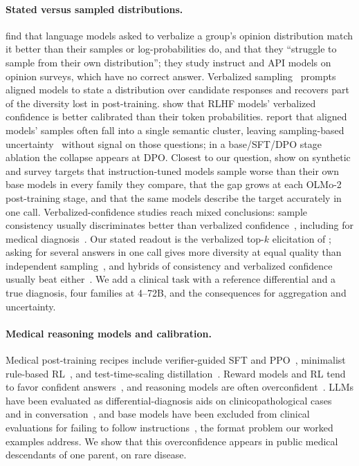 \documentclass[11pt]{article}
\begin{document}
\paragraph{Stated versus sampled distributions.}
\citet{meister2025distributional} find that language models asked to verbalize a group's opinion distribution match it better than their samples or log-probabilities do, and that they ``struggle to sample from their own distribution''; they study instruct and API models on opinion surveys, which have no correct answer.
Verbalized sampling~\citep{zhang2025verbalized} prompts aligned models to state a distribution over candidate responses and recovers part of the diversity lost in post-training.
\citet{tian2023justask} show that RLHF models' verbalized confidence is better calibrated than their token probabilities.
\citet{liu2026alignmenttax} report that aligned models' samples often fall into a single semantic cluster, leaving sampling-based uncertainty~\citep{kuhn2023semantic,farquhar2024semanticentropy} without signal on those questions; in a base/SFT/DPO stage ablation the collapse appears at DPO.
Closest to our question, \citet{jang2026cannotsample} show on synthetic and survey targets that instruction-tuned models sample worse than their own base models in every family they compare, that the gap grows at each OLMo-2 post-training stage, and that the same models describe the target accurately in one call. Verbalized-confidence studies reach mixed conclusions: sample consistency usually discriminates better than verbalized confidence~\citep{xiong2024express}, including for medical diagnosis~\citep{savage2025uncertainty}.
Our stated readout is the verbalized top-$k$ elicitation of \citet{tian2023justask}; asking for several answers in one call gives more diversity at equal quality than independent sampling~\citep{troshin2025asking}, and hybrids of consistency and verbalized confidence usually beat either~\citep{xiong2024express,lyu2024consistency,ren2026medconf}. We add a clinical task with a reference differential and a true diagnosis, four families at 4--72B, and the consequences for aggregation and uncertainty.

\paragraph{Medical reasoning models and calibration.}
Medical post-training recipes include verifier-guided SFT and PPO~\citep{chen2024huatuogpto1}, minimalist rule-based RL~\citep{liu2025alphamed}, and test-time-scaling distillation~\citep{huang2025m1}.
Reward models and RL tend to favor confident answers~\citep{leng2025taming,damani2025rlcr}, and reasoning models are often overconfident~\citep{mei2025reasoninguncertainty}.
LLMs have been evaluated as differential-diagnosis aids on clinicopathological cases~\citep{kanjee2023jama,mcduff2025ddx} and in conversation~\citep{tu2025amie}, and base models have been excluded from clinical evaluations for failing to follow instructions~\citep{hager2024clinical}, the format problem our worked examples address. We show that this overconfidence appears in public medical descendants of one parent, on rare disease.
\end{document}

